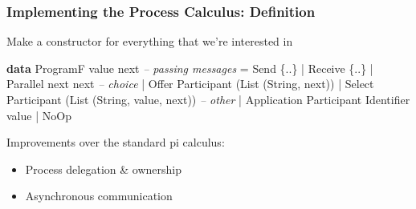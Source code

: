 \documentclass[12pt]{beamer}
\newenvironment{Shaded}{}{}
\newcommand{\KeywordTok}[1]{\textcolor[rgb]{0.00,0.44,0.13}{\textbf{#1}}}
\newcommand{\DataTypeTok}[1]{\textcolor[rgb]{0.56,0.13,0.00}{#1}}
\newcommand{\CommentTok}[1]{\textcolor[rgb]{0.38,0.63,0.69}{\textit{#1}}}
\newcommand{\FunctionTok}[1]{\textcolor[rgb]{0.02,0.16,0.49}{#1}}
\newcommand{\NormalTok}[1]{#1}
\begin{document}
\begin{frame}[fragile, t]
\frametitle{Implementing the Process Calculus: Definition}

Make a constructor for everything that we're interested in

\begin{Shaded}
\begin{Highlighting}[]
\KeywordTok{data} \DataTypeTok{ProgramF}\NormalTok{ value next }
    \CommentTok{-- passing messages}
    \FunctionTok{=} \DataTypeTok{Send}\NormalTok{ \{..\}}
    \FunctionTok{|} \DataTypeTok{Receive}\NormalTok{ \{..\}}
    \FunctionTok{|} \DataTypeTok{Parallel}\NormalTok{ next next }
    \CommentTok{-- choice}
    \FunctionTok{|} \DataTypeTok{Offer} \DataTypeTok{Participant}\NormalTok{ (}\DataTypeTok{List}\NormalTok{ (}\DataTypeTok{String}\NormalTok{, next))}
    \FunctionTok{|} \DataTypeTok{Select} \DataTypeTok{Participant}\NormalTok{ (}\DataTypeTok{List}\NormalTok{ (}\DataTypeTok{String}\NormalTok{, value, next))}
    \CommentTok{-- other}
    \FunctionTok{|} \DataTypeTok{Application} \DataTypeTok{Participant} \DataTypeTok{Identifier}\NormalTok{ value}
    \FunctionTok{|} \DataTypeTok{NoOp}
\end{Highlighting}
\end{Shaded}

Improvements over the standard pi calculus:
\begin{itemize}
    \item Process delegation \& ownership
    \item Asynchronous communication 
\end{itemize}


\end{frame}
\end{document}
